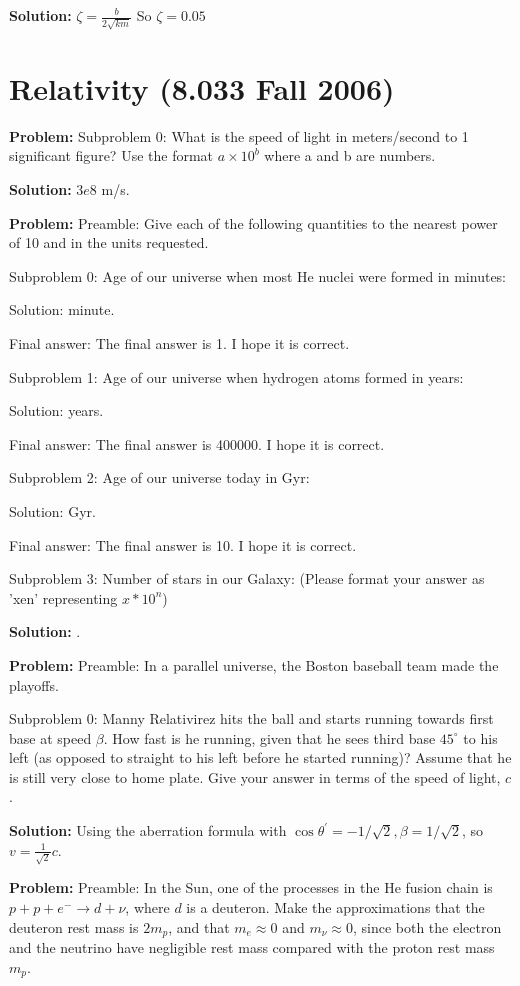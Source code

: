 \documentclass[10pt]{article}
\begin{document}
\textbf{Solution:}
$\zeta=\frac{b}{2 \sqrt{k m}}$
So
$\zeta =\boxed{0.05}$


\section{Relativity (8.033 Fall 2006)}

\textbf{Problem:}
Subproblem 0: What is the speed of light in meters/second to 1 significant figure? Use the format $a \times 10^{b}$ where a and b are numbers. 


\textbf{Solution:}
$\boxed{3e8}$ m/s.


\textbf{Problem:}
Preamble: Give each of the following quantities to the nearest power of 10 and in the units requested. 

Subproblem 0: Age of our universe when most He nuclei were formed in minutes: 


Solution:  minute.

Final answer: The final answer is 1. I hope it is correct.

Subproblem 1: Age of our universe when hydrogen atoms formed in years:


Solution:  years.

Final answer: The final answer is 400000. I hope it is correct.

Subproblem 2: Age of our universe today in Gyr:


Solution:  Gyr.

Final answer: The final answer is 10. I hope it is correct.

Subproblem 3: Number of stars in our Galaxy: (Please format your answer as 'xen' representing $x * 10^n$)


\textbf{Solution:}
.


\textbf{Problem:}
Preamble: In a parallel universe, the Boston baseball team made the playoffs.

Subproblem 0: Manny Relativirez hits the ball and starts running towards first base at speed $\beta$. How fast is he running, given that he sees third base $45^{\circ}$ to his left (as opposed to straight to his left before he started running)? Assume that he is still very close to home plate. Give your answer in terms of the speed of light, $c$.


\textbf{Solution:}
Using the aberration formula with $\cos \theta^{\prime}=-1 / \sqrt{2}, \beta=1 / \sqrt{2}$, so $v=\boxed{\frac{1}{\sqrt{2}}c}$.


\textbf{Problem:}
Preamble: In the Sun, one of the processes in the He fusion chain is $p+p+e^{-} \rightarrow d+\nu$, where $d$ is a deuteron. Make the approximations that the deuteron rest mass is $2 m_{p}$, and that $m_{e} \approx 0$ and $m_{\nu} \approx 0$, since both the electron and the neutrino have negligible rest mass compared with the proton rest mass $m_{p}$.
\end{document}

